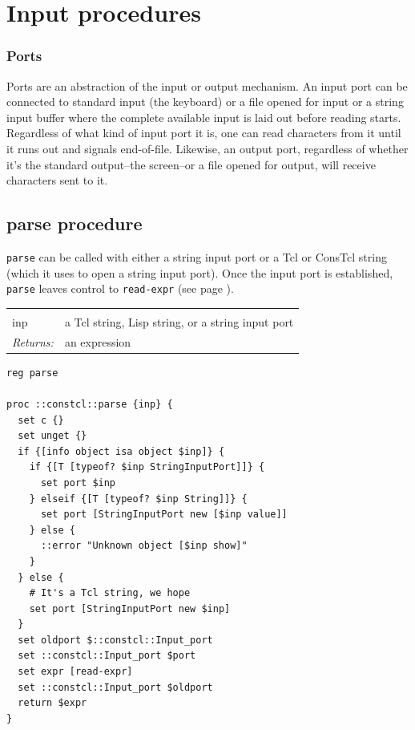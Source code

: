 \documentclass[twoside,9pt]{report}
\begin{document}
\section{Input procedures}
\label{input-procedures}

\begin{pulledtext}
\subsubsection{Ports}
\label{ports}


Ports are an abstraction of the input or output mechanism. An input port can be connected to standard input (the keyboard) or a file opened for input or a string input buffer where the complete available input is laid out before reading starts. Regardless of what kind of input port it is, one can read characters from it until it runs out and signals end-of-file. Likewise, an output port, regardless of whether it's the standard output--the screen--or a file opened for output, will receive characters sent to it.

\end{pulledtext}

\subsection{parse procedure}
\label{parse-procedure}


\texttt{parse} can be called with either a string input port or a Tcl or ConsTcl string (which it uses to open a string input port). Once the input port is established, \texttt{parse} leaves control to \texttt{read-expr} (see page \pageref{read-expr-procedure}).

\noindent\begin{tabular}{ |p{1.9cm} p{8cm}| }
\hline
\rowcolor[HTML]{CCCCCC} \multicolumn{2}{|l|}{\bf parse (internal)} \\
inp & a Tcl string, Lisp string, or a string input port \\
\textit{Returns:} & an expression \\
\hline
\end{tabular}
\begin{lstlisting}
reg parse

proc ::constcl::parse {inp} {
  set c {}
  set unget {}
  if {[info object isa object $inp]} {
    if {[T [typeof? $inp StringInputPort]]} {
      set port $inp
    } elseif {[T [typeof? $inp String]]} {
      set port [StringInputPort new [$inp value]]
    } else {
      ::error "Unknown object [$inp show]"
    }
  } else {
    # It's a Tcl string, we hope
    set port [StringInputPort new $inp]
  }
  set oldport $::constcl::Input_port
  set ::constcl::Input_port $port
  set expr [read-expr]
  set ::constcl::Input_port $oldport
  return $expr
}
\end{lstlisting}
\end{document}
